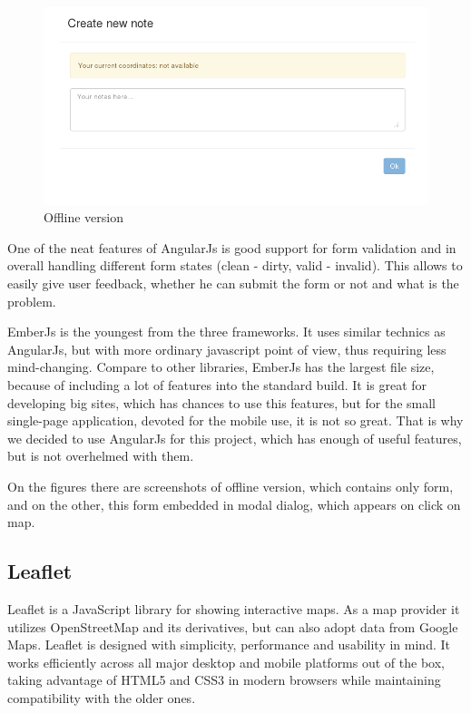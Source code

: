 \documentclass[12pt,a4paper]{article}
\begin{document}
    \begin{figure}[h]
      \begin{center}
        \includegraphics[width=\textwidth]{res/offline}
      \end{center}
      \caption{Offline version}
    \end{figure}

One of the neat features of AngularJs is good support for form validation and in overall
handling different form states (clean - dirty, valid - invalid). This allows to
easily give user feedback, whether he can submit the form or not and what is the problem.

EmberJs is the youngest from the three frameworks. It uses similar technics
as AngularJs, but with more ordinary javascript point of view, thus requiring
less mind-changing. Compare to other libraries, EmberJs has the largest file size,
because of including a lot of features into the standard build. It is great for
developing big sites, which has chances to use this features, but for the small
single-page application, devoted for the mobile use, it is not so great. That is
why we decided to use AngularJs for this project, which has enough of useful
features, but is not overhelmed with them.

On the figures there are screenshots of offline version, which contains only form,
and on the other, this form embedded in modal dialog, which appears on click on map.

\subsection{Leaflet}

Leaflet is a JavaScript library for showing interactive maps. As a map
provider it utilizes OpenStreetMap and its derivatives, but can also
adopt data from Google Maps. Leaflet is designed with simplicity,
performance and usability in mind. It works efficiently across all
major desktop and mobile platforms out of the box, taking advantage of
HTML5 and CSS3 in modern browsers while maintaining compatibility with
the older ones.
\end{document}
